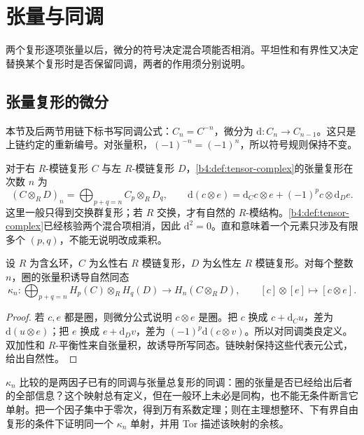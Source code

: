 
\section{张量与同调}
\label{b4:sec:0902}

两个复形逐项张量以后，微分的符号决定混合项能否相消。平坦性和有界性又决定替换某个复形时是否保留同调，两者的作用须分别说明。

%
%

\subsection{张量复形的微分}
\label{b4:subsec:0902:01}

本节及后两节用链下标书写同调公式：\(C_n=C^{-n}\)，微分为 \(\mathrm{d}:C_n\to C_{n-1}\)。这只是上链约定的重新编号。对张量积，\((-1)^{-n}=(-1)^n\)，所以符号规则保持不变。

\ProseParagraphBreak
对于右 \(R\)-模链复形 \(C\) 与左 \(R\)-模链复形 \(D\)，\cref{b4:def:tensor-complex}的张量复形在次数 \(n\) 为
\[
	(C\otimes_R D)_n=\bigoplus_{p+q=n}C_p\otimes_R D_q, \qquad \mathrm{d}(c\otimes e)=\mathrm{d}_Cc\otimes e+(-1)^pc\otimes \mathrm{d}_De.
\]
这里一般只得到交换群复形；若 \(R\) 交换，才有自然的 \(R\)-模结构。\cref{b4:def:tensor-complex}已经核验两个混合项相消，因此 \(\mathrm{d}^2=0\)。直和意味着一个元素只涉及有限多个 \((p,q)\)，不能无说明改成乘积。

\begin{proposition}\label{b4:prop:tensor-homology-map}
	设 \(R\) 为含幺环，\(C\) 为幺性右 \(R\) 模链复形，\(D\) 为幺性左 \(R\) 模链复形。对每个整数 \(n\)，圈的张量积诱导自然同态
	\[
		\kappa_n:\bigoplus_{p+q=n}H_p(C)\otimes_R H_q(D) \longrightarrow H_n(C\otimes_R D),\qquad [c]\otimes[e]\longmapsto[c\otimes e].
	\]
\end{proposition}
\begin{proof}
	若 \(c,e\) 都是圈，则微分公式说明 \(c\otimes e\) 是圈。把 \(c\) 换成 \(c+\mathrm{d}_Cu\)，差为 \(\mathrm{d}(u\otimes e)\)；把 \(e\) 换成 \(e+\mathrm{d}_Dv\)，差为 \((-1)^p \mathrm{d}(c\otimes v)\)。所以对同调类良定义。双加性和 \(R\)-平衡性来自张量积，故诱导所写同态。链映射保持这些代表元公式，给出自然性。
\end{proof}

\(\kappa_n\) 比较的是两因子已有的同调与张量总复形的同调：圈的张量是否已经给出后者的全部信息？这个映射总有定义，但在一般环上未必是同构，也不能无条件断言它单射。把一个因子集中于零次，得到万有系数定理；则在主理想整环、下有界自由复形的条件下证明同一个 \(\kappa_n\) 单射，并用 Tor 描述该映射的余核。

